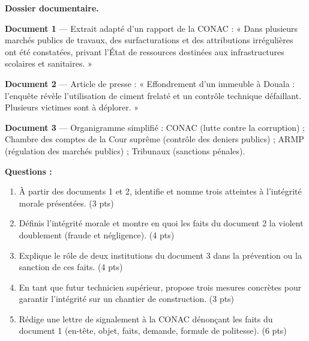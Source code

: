 \documentclass[11pt]{article}
\begin{document}
\begin{exercice}
\textbf{Dossier documentaire.}

\textbf{Document 1} — Extrait adapté d'un rapport de la CONAC : « Dans plusieurs marchés publics de travaux, des surfacturations et des attributions irrégulières ont été constatées, privant l'État de ressources destinées aux infrastructures scolaires et sanitaires. »

\textbf{Document 2} — Article de presse : « Effondrement d'un immeuble à Douala : l'enquête révèle l'utilisation de ciment frelaté et un contrôle technique défaillant. Plusieurs victimes sont à déplorer. »

\textbf{Document 3} — Organigramme simplifié : CONAC (lutte contre la corruption) ; Chambre des comptes de la Cour suprême (contrôle des deniers publics) ; ARMP (régulation des marchés publics) ; Tribunaux (sanctions pénales).

\textbf{Questions :}
\begin{enumerate}
\item À partir des documents 1 et 2, identifie et nomme trois atteintes à l'intégrité morale présentées. (3 pts)
\item Définis l'intégrité morale et montre en quoi les faits du document 2 la violent doublement (fraude et négligence). (4 pts)
\item Explique le rôle de deux institutions du document 3 dans la prévention ou la sanction de ces faits. (4 pts)
\item En tant que futur technicien supérieur, propose trois mesures concrètes pour garantir l'intégrité sur un chantier de construction. (3 pts)
\item Rédige une lettre de signalement à la CONAC dénonçant les faits du document 1 (en-tête, objet, faits, demande, formule de politesse). (6 pts)
\end{enumerate}
\end{exercice}
\end{document}
